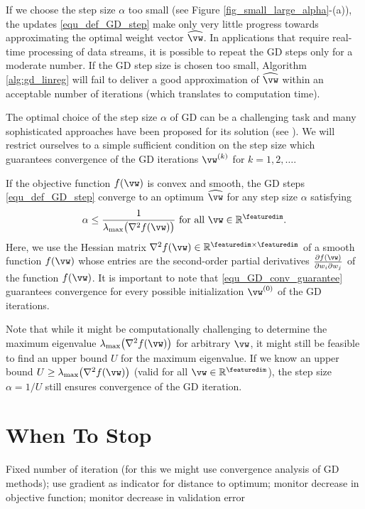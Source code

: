 \documentclass[12pt]{report}
\begin{document}
If we choose the step size $\alpha$ too small (see Figure \ref{fig_small_large_alpha}-(a)), 
the updates \eqref{equ_def_GD_step} make only very little progress towards 
approximating the optimal weight vector $\widehat{\vw}$. In applications that
require real-time processing of data streams, it is possible to repeat the GD 
steps only for a moderate number. If the GD step size is chosen too 
small, Algorithm \ref{alg:gd_linreg} will fail to deliver a good approximation 
of $\widehat{\vw}$ within an acceptable number of iterations (which translates 
to computation time). 

The optimal choice of the step size $\alpha$ of GD can be a challenging 
task and many sophisticated approaches have been proposed for its 
solution (see \cite[Chapter 8]{Goodfellow-et-al-2016}). We will restrict 
ourselves to a simple sufficient condition on the step size which guarantees 
convergence of the GD iterations $\vw^{(k)}$ for $k=1,2,\ldots$. 

If the objective function $f(\vw)$ is convex and smooth, the 
GD steps \eqref{equ_def_GD_step} converge to an optimum 
$\widehat{\vw}$ for any step size $\alpha$ satisfying \cite{nestrov04}
\begin{equation} 
\label{equ_GD_conv_guarantee}
\alpha \leq \frac{1}{\lambda_{\rm max} \big( \nabla^{2} f(\vw) \big) }\mbox{ for all } \vw \in \mathbb{R}^{\featuredim}. 
\end{equation} 
Here, we use the Hessian matrix $ \nabla^{2} f(\vw) \in \mathbb{R}^{\featuredim \times \featuredim}$ 
of a smooth function $f(\vw)$ whose entries are the second-order 
partial derivatives $\frac{\partial f(\vw)}{\partial w_{i} \partial w_{j}}$ 
of the function $f(\vw)$. It is important to note that \eqref{equ_GD_conv_guarantee} 
guarantees convergence for every possible initialization $\vw^{(0)}$ 
of the GD iterations. 

Note that while it might be computationally challenging to determine the maximum eigenvalue 
$\lambda_{\rm max} \big( \nabla^{2} f(\vw) \big)$ for arbitrary $\vw$, it might still be feasible to find an 
upper bound $U$ for the maximum eigenvalue. If we know an upper bound $U \geq \lambda_{\rm max} \big( \nabla^{2} f(\vw) \big)$ (valid for all $\vw \in \mathbb{R}^{\featuredim}$), 
the step size $\alpha =1/U$ still ensures convergence of the GD iteration.

\section{When To Stop} 
Fixed number of iteration (for this we might use convergence analysis of GD methods); 
use gradient as indicator for distance to optimum; monitor decrease in objective function; 
monitor decrease in validation error
\end{document}
